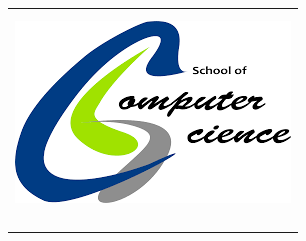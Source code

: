 \begin{table}[H]
	\centering
	\begin{tabular}{|x{\textwidth}|}
	\hline 
	\MakeUppercase{\csuniversidad} \\
	\\
	\begin{minipage}{.3\textwidth}
		\includegraphics[width=\textwidth]{../imgs/cs2}
	\end{minipage} \\
	\\
	\textbf{\MakeUppercase{\csepcc}} \\
	\MakeUppercase{\csfacultad} \\
	\MakeUppercase{\csdepartamento} \\
	\hline 
	\end{tabular}
\end{table}
